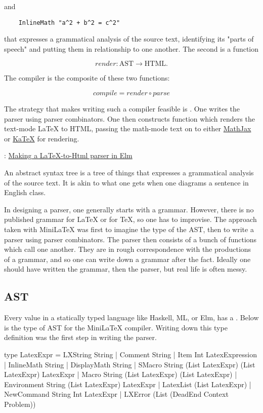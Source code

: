 and

\begin{verbatim}
    InlineMath "a^2 + b^2 = c^2"
\end{verbatim}

 that expresses a grammatical analysis of the source text, identifying its "parts of speech" and putting them in relationship to one another.
The second is a function

$$
render: \text{AST} \to \text{HTML}.
$$

The compiler is the composite of these two functions:

$$
compile   = render \circ parse
$$

The strategy that makes writing such a compiler feasible is .  One writes the parser using parser combinators.  One then constructs function which renders the text-mode LaTeX to HTML, passing the math-mode text on to either \href{https://mathjax.org}{MathJax} or \href{https://katex.org}{KaTeX} for rendering.

: \href{https://www.youtube.com/watch?v=dmDA7iziSgs&t=15s}{Making a LaTeX-to-Html parser in Elm}

An abstract syntax tree is a tree of things that expresses a grammatical analysis of the source text. It is akin to what one gets when one diagrams a sentence in English class.




In designing a parser, one generally starts with a grammar.  However, there is no published grammar for LaTeX or for TeX, so one has to improvise.  The approach taken with MiniLaTeX was first to imagine the type of the AST, then to write a parser using parser combinators.  The parser then consists of a bunch of functions which call one another.  They are in rough correspondence with the productions of a grammar, and so one can write down a grammar after the fact. Ideally one should have written the grammar, then the parser, but real life is often messy.

\subsection{AST}

Every value in a statically typed language like Haskell, ML, or Elm, has a .  Below is the type of AST for the MiniLaTeX compiler.  Writing down this type definition was the first step in writing the parser.

\begin{listing}
type LatexExpr
    = LXString String
    | Comment String
    | Item Int LatexExpression
    | InlineMath String
    | DisplayMath String
    | SMacro String (List LatexExpr) (List LatexExpr) LatexExpr
    | Macro String (List LatexExpr) (List LatexExpr)
    | Environment String (List LatexExpr) LatexExpr
    | LatexList (List LatexExpr)
    | NewCommand String Int LatexExpr
    | LXError (List (DeadEnd Context Problem))
\end{listing}

